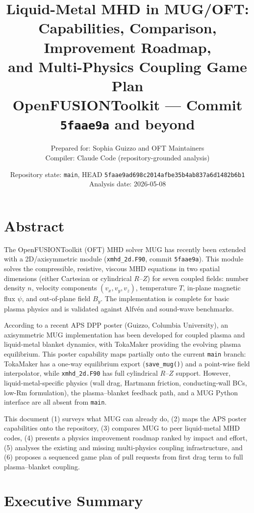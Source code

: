 \documentclass[11pt,letterpaper]{article}
\title{\textbf{Liquid-Metal MHD in MUG/OFT:\\
Capabilities, Comparison, Improvement Roadmap,\\
and Multi-Physics Coupling Game Plan}\\
\large OpenFUSIONToolkit --- Commit \texttt{5faae9a} and beyond}
\author{Prepared for: Sophia Guizzo and OFT Maintainers\\
Compiler: Claude Code (repository-grounded analysis)}
\date{Repository state: \texttt{main}, HEAD \texttt{5faae9ad698c2014afbe35b4ab837a6d1482b6b1}\\
Analysis date: 2026-05-08}
\begin{document}
\maketitle
\tableofcontents
\newpage

\section{Abstract}

The OpenFUSIONToolkit (OFT) MHD solver MUG has recently been extended with a
2D/axisymmetric module (\texttt{xmhd\_2d.F90}, commit \texttt{5faae9a}).  This
module solves the compressible, resistive, viscous MHD equations in two
spatial dimensions (either Cartesian or cylindrical $R$--$Z$) for seven coupled
fields: number density $n$, velocity components $(v_x, v_y, v_z)$, temperature
$T$, in-plane magnetic flux $\psi$, and out-of-plane field $B_y$.  The
implementation is complete for basic plasma physics and is validated against
Alfv\'{e}n and sound-wave benchmarks.

According to a recent APS DPP poster (Guizzo, Columbia University), an
axisymmetric MUG implementation has been developed for coupled plasma and
liquid-metal blanket dynamics, with TokaMaker providing the evolving plasma
equilibrium.  This poster capability maps partially onto the current
\texttt{main} branch: TokaMaker has a one-way equilibrium export
(\texttt{save\_mug()}) and a point-wise field interpolator, while
\texttt{xmhd\_2d.F90} has full cylindrical $R$--$Z$ support.  However,
liquid-metal-specific physics (wall drag, Hartmann friction, conducting-wall
BCs, low-Rm formulation), the plasma--blanket feedback path, and a MUG Python
interface are all absent from \texttt{main}.

This document (1) surveys what MUG can already do, (2) maps the APS poster
capabilities onto the repository, (3) compares MUG to peer liquid-metal MHD
codes, (4) presents a physics improvement roadmap ranked by impact and effort,
(5) analyses the existing and missing multi-physics coupling infrastructure, and
(6) proposes a sequenced game plan of pull requests from first drag term to
full plasma--blanket coupling.

\section{Executive Summary}
\end{document}
